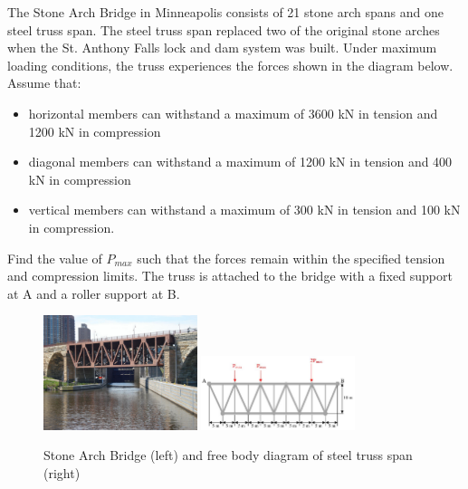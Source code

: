 
The Stone Arch Bridge in Minneapolis consists of 21 stone arch spans and one steel truss span. The steel truss
span replaced two of the original stone arches when the St. Anthony Falls lock and dam system was built.
Under maximum loading conditions, the truss experiences the forces shown in the diagram below. Assume
that:
\begin{itemize}
  \item horizontal members can withstand a maximum of 3600 kN in tension and 1200 kN in compression
  \item diagonal members can withstand a maximum of 1200 kN in tension and 400 kN in compression
  \item vertical members can withstand a maximum of 300 kN in tension and 100 kN in compression.
\end{itemize}

Find the value of $P_{max}$ such that the forces remain within the specified tension and compression limits. The truss is attached
to the bridge with a fixed support at A and a roller support at B.

\begin{figure}[ht!]
  \centering
  \includegraphics[width=0.4\textwidth,
	           height=0.4\textheight,
		   keepaspectratio]{figa.png}
  \includegraphics[width=0.4\textwidth,
	           height=0.4\textheight,
		   keepaspectratio]{figb.png}
  \caption*{Stone Arch Bridge (left) and free body diagram of steel truss span (right)}
\end{figure}

